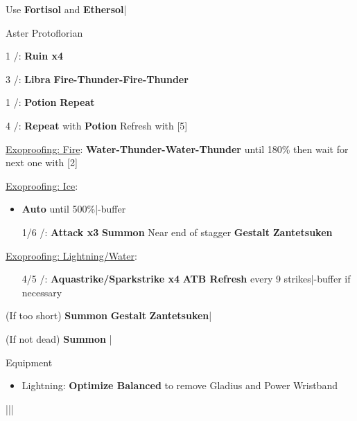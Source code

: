 \begin{mainlist}
	\item Use \textbf{Fortisol} and \textbf{Ethersol}|\skip
\end{mainlist}
\begin{fight}{Aster Protoflorian}
	\item [1] \com/\rav: \textbf{Ruin x4}
	\item [3] \rav/\syn: \textbf{Libra} \to \textbf{Fire-Thunder-Fire-Thunder}
	\item [1] \com/\rav: \textbf{\textbf{Potion}} \to \textbf{Repeat}
	\item [4] \rav/\rav: \textbf{Repeat} with \textbf{Potion} \to Refresh with [5]
	\item \underline{Exoproofing: Fire}: \textbf{Water-Thunder-Water-Thunder} until 180\% then wait for next one with [2]
	\item \underline{Exoproofing: Ice}:
	\begin{itemize}
		\item \textbf{Auto} until 500\%|\com-buffer
		\item [1/6] \com/\rav: \textbf{Attack x3} \to \textbf{Summon} Near end of stagger \to \textbf{Gestalt} \to \textbf{Zantetsuken}
	\end{itemize}
	\item \underline{Exoproofing: Lightning/Water}:
	\begin{itemize}
		\item [4/5] \rav/\rav: \textbf{Aquastrike/Sparkstrike x4} \to \textbf{ATB Refresh} every 9 strikes|\com-buffer if necessary
	\end{itemize}
	\item (If too short) \textbf{Summon} \to \textbf{Gestalt} \to \textbf{Zantetsuken}|\skip
	\item (If not dead) \textbf{Summon} |\skip
\end{fight}
\begin{menu}
	\item Equipment
	\begin{itemize}
		\item Lightning: \textbf{Optimize Balanced} to remove Gladius and Power Wristband
	\end{itemize}
\end{menu}
\begin{mainlist}
	\item \skip|\save||\save
\end{mainlist}
